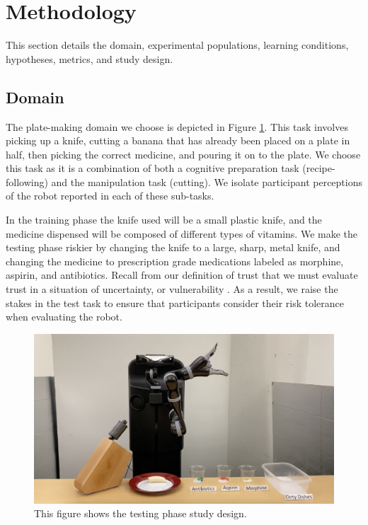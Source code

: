 \documentclass[letterpaper]{article} %
\begin{document}

\section{Methodology}
\label{sec:methods}
This section details the domain, experimental populations, learning conditions, hypotheses, metrics, and study design. %

\subsection{Domain}
\label{sec:domain}
The plate-making domain we choose is depicted in Figure \ref{fig:study_setup}. This task involves picking up a knife, cutting a banana that has already been placed on a plate in half, then picking the correct medicine, and pouring it on to the plate. We choose this task as it is a combination of both a cognitive preparation task (recipe-following) and the manipulation task (cutting). We isolate participant perceptions of the robot reported in each of these sub-tasks. 

In the training phase the knife used will be a small plastic knife, and the medicine dispensed will be composed of different types of vitamins. We make the testing phase riskier by changing the knife to a large, sharp, metal knife, and changing the medicine to prescription grade medications labeled as morphine, aspirin, and antibiotics. Recall from our definition of trust that we must evaluate trust in a situation of uncertainty, or vulnerability \cite{kohn_measurement_2021, ullman_what_2018}. As a result, we raise the stakes in the test task to ensure that participants consider their risk tolerance when evaluating the robot.

\begin{figure}[ht]
    \centering
    \includegraphics[width=1\columnwidth]{Figures/testing_setup.png}
  \caption{This figure shows the testing phase study design.}
    \label{fig:study_setup}
\end{figure}
\end{document}
